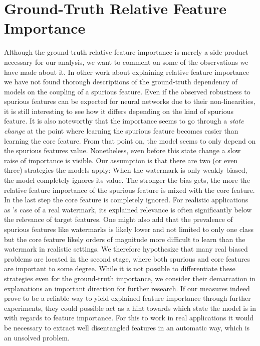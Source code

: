 \section{Ground-Truth Relative Feature Importance}
Although the ground-truth relative feature importance is merely a side-product necessary for our analysis, we want to comment on some of the observations we have made about it. 
In other work about explaining relative feature importance we have not found thorough descriptions of the ground-truth dependency of models on the coupling of a spurious feature. Even if the observed robustness to spurious features can be expected for neural networks due to their non-linearities, it is still interesting to see how it differs depending on the kind of spurious feature.
It is also noteworthy that the importance seems to go through a \textit{state change} at the point where learning the spurious feature becomes easier than learning the core feature. From that point on, the model seems to only depend on the spurious features value. 
Nonetheless, even before this state change a slow raise of importance is visible. Our assumption is that there are two (or even three) strategies the models apply:
When the watermark is only weakly biased, the model completely ignores its value. The stronger the bias gets, the more the relative feature importance of the spurious feature is mixed with the core feature. In the last step the core feature is completely ignored. 
For realistic applications as \citeauthor{Achtibat2022}'s case of a real watermark, its explained relevance is often significantly below the relevance of target features. One might also add that the prevalence of spurious features like watermarks is likely lower and not limited to only one class but the core feature likely orders of magnitude more difficult to learn than the watermark in realistic settings.
We therefore hypothesize that many real biased problems are located in the second stage, where both spurious and core features are important to some degree.
While it is not possible to differentiate these strategies even for the ground-truth importance, we consider their demarcation in explanations an important direction for further research.
If our measures indeed prove to be a reliable way to yield explained feature importance through further experiments, they could possible act as a hint towards which state the model is in with regards to feature importance. For this to work in real applications it would be necessary to extract well disentangled features in an automatic way, which is an unsolved problem. 


